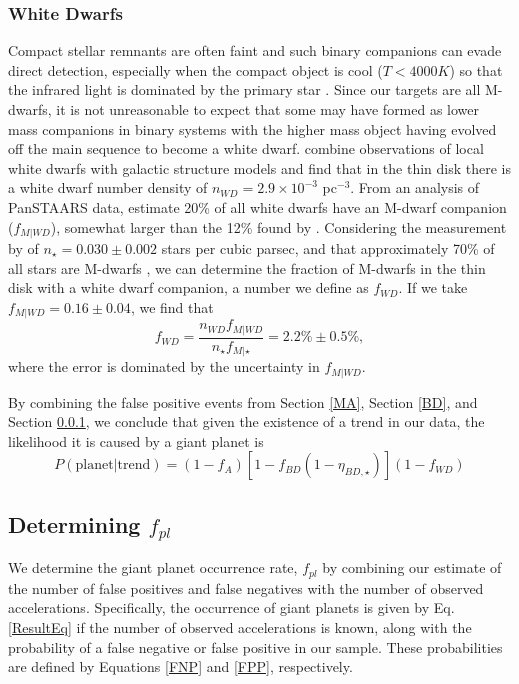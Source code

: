 \subsubsection{White Dwarfs}
\label{WD}
Compact stellar remnants are often faint and such binary companions can evade direct detection, especially when the compact object is cool ($T < 4000 K$) so that the infrared light is dominated by the primary star \citep{Crepp13b}. Since our targets are all M-dwarfs, it is not unreasonable to expect that some may have formed as lower mass companions in binary systems with the higher mass object having evolved off the main sequence to become a white dwarf.  \citet{Napiwotzki09} combine observations of local white dwarfs with galactic structure models and find that in the thin disk there is a white dwarf number density of $n_{WD} = 2.9 \times 10^{-3}$ pc$^{-3}$. From an analysis of PanSTAARS data, \citet{Wheeler12} estimate 20\% of all white dwarfs have an M-dwarf companion ($f_{M|WD}$), somewhat larger than the 12\% found by \citet{Napiwotzki09}. Considering the measurement by \citet{Chang11} of $n_\star = 0.030 \pm 0.002$ stars per cubic parsec, and that approximately 70\% of all stars are M-dwarfs \citep[$f_{M|\star}$,][]{Henry06}, we can determine the fraction of M-dwarfs in the thin disk with a white dwarf companion, a number we define as $f_{WD}$. If we take $f_{M|WD} = 0.16 \pm 0.04$, we find that 
\begin{equation}
f_{WD} = \frac{n_{WD}f_{M|WD}}{n_\star f_{M|\star}} = 2.2\% \pm 0.5\%,
\end{equation}
where the error is dominated by the uncertainty in $f_{M|WD}$.

By combining the false positive events from Section \ref{MA}, Section \ref{BD}, and Section \ref{WD}, we conclude that given the existence of a trend in our data, the likelihood it is caused by a giant planet is 
\begin{equation}
P(\mbox{planet}|\mbox{trend}) = (1-f_A)[1-f_{BD}(1-\eta_{BD, \star})](1-f_{WD})
\label{FPP}
\end{equation}

\subsection{Determining $f_{pl}$}
\label{Methods}

We determine the giant planet occurrence rate, $f_{pl}$ by combining our estimate of the number of false positives and false negatives with the number of observed accelerations. Specifically, the occurrence of giant planets is given by Eq. \ref{ResultEq} if the number of observed accelerations is known, along with the probability of a false negative or false positive in our sample. These probabilities are defined by Equations \ref{FNP} and \ref{FPP}, respectively. 

